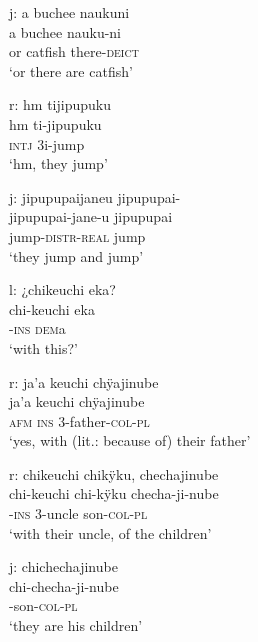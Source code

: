 \ea%
\begingl
\glpreamble \textup{j:} a buchee naukuni\\
\gla a buchee nauku-ni\\
\glb or catfish there-\textsc{deict}\\
\glft ‘or there are catfish’
\endgl
\xe

\ea%
\begingl
\glpreamble \textup{r:} hm tijipupuku\\
\gla hm ti-jipupuku\\
\glb \textsc{intj} 3i-jump\\
\glft ‘hm, they jump’
\endgl
\xe


\ea%
\begingl
\glpreamble \textup{j:} jipupupaijaneu jipupupai-\\
\gla jipupupai-jane-u jipupupai\\
\glb jump-\textsc{distr}-\textsc{real} jump\\
\glft ‘they jump and jump’
\endgl
\xe


\ea%
\begingl
\glpreamble \textup{l:} ¿chikeuchi eka?\\
\gla chi-keuchi eka\\
-\textsc{ins} \textsc{dem}a\\
\glft ‘with this?’
\endgl
\xe



\ea%
\begingl
\glpreamble \textup{r:}  ja’a keuchi chÿajinube\\
\gla  ja’a keuchi chÿajinube\\
\glb \textsc{afm} \textsc{ins} 3-father-\textsc{col}-\textsc{pl}\\
\glft ‘yes, with (lit.: because of) their father’
\endgl
\xe


\ea%
\begingl
\glpreamble \textup{r:} chikeuchi chikÿku, chechajinube\\
\gla chi-keuchi chi-kÿku checha-ji-nube\\
-\textsc{ins} 3-uncle son-\textsc{col}-\textsc{pl}\\
\glft ‘with their uncle, of the children’
\endgl
\xe



\ea%
\begingl
\glpreamble \textup{j:} chichechajinube\\
\gla chi-checha-ji-nube\\
-son-\textsc{col}-\textsc{pl}\\
\glft ‘they are his children’
\endgl
\xe


